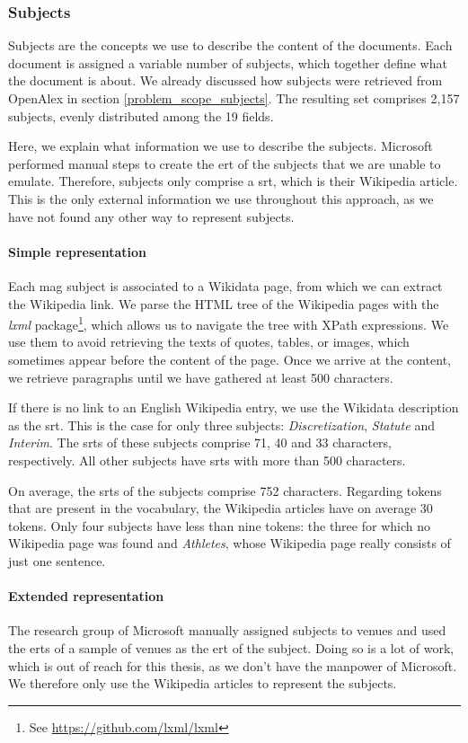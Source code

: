 \subsubsection{Subjects}

Subjects are the concepts we use to describe the content of the documents. Each document is assigned a variable number of subjects, which together define what the document is about. We already discussed how subjects were retrieved from OpenAlex in section \ref{problem_scope_subjects}. The resulting set comprises 2,157 subjects, evenly distributed among the 19 fields.

Here, we explain what information we use to describe the subjects. Microsoft performed manual steps to create the \acrshort{ert} of the subjects that we are unable to emulate. Therefore, subjects only comprise a \acrshort{srt}, which is their Wikipedia article. This is the only external information we use throughout this approach, as we have not found any other way to represent subjects.

\paragraph{Simple representation} \mbox{}

Each \acrshort{mag} subject is associated to a Wikidata page, from which we can extract the Wikipedia link. We parse the HTML tree of the Wikipedia pages with the \textit{lxml} package\footnote{See \url{https://github.com/lxml/lxml}}, which allows us to navigate the tree with XPath expressions. We use them to avoid retrieving the texts of quotes, tables, or images, which sometimes appear before the content of the page. Once we arrive at the content, we retrieve paragraphs until we have gathered at least 500 characters.

If there is no link to an English Wikipedia entry, we use the Wikidata description as the \acrshort{srt}. This is the case for only three subjects: \textit{Discretization}, \textit{Statute} and \textit{Interim}. The \acrshort{srt}s of these subjects comprise 71, 40 and 33 characters, respectively. All other subjects have \acrshort{srt}s with more than 500 characters.

On average, the \acrshort{srt}s of the subjects comprise 752 characters. Regarding tokens that are present in the vocabulary, the Wikipedia articles have on average 30 tokens. Only four subjects have less than nine tokens: the three for which no Wikipedia page was found and \textit{Athletes}, whose Wikipedia page really consists of just one sentence.

\paragraph{Extended representation} \mbox{}

The research group of Microsoft manually assigned subjects to venues and used the \acrshort{ert}s of a sample of venues as the \acrshort{ert} of the subject. Doing so is a lot of work, which is out of reach for this thesis, as we don't have the manpower of Microsoft. We therefore only use the Wikipedia articles to represent the subjects.
